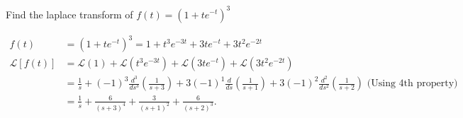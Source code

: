 \begin{exercise}
	Find the laplace transform of $f(t)=\left(1+t e^{-t}\right)^{3}$
\end{exercise}
\begin{answer}
	\begin{align*}
	f(t)&=\left(1+t e^{-t}\right)^{3}=1+t^{3} e^{-3 t}+3 t e^{-t}+3 t^{2} e^{-2 t} \\
	\mathcal{L}[f(t)]&=\mathcal{L}(1)+\mathcal{L}\left(t^{3} e^{-3 t}\right)+\mathcal{L}\left(3 t e^{-t}\right)+\mathcal{L}\left(3 t^{2} e^{-2 t}\right)\\
	&=\frac{1}{s}+(-1)^{3} \frac{d^{3}}{d s^{3}}\left(\frac{1}{s+3}\right)+3(-1)^{1} \frac{d}{d s}\left(\frac{1}{s+1}\right)+3(-1)^{2} \frac{d^{2}}{d s^{2}}\left(\frac{1}{s+2}\right)\text{ (Using 4th property)}\\
	&=\frac{1}{s}+\frac{6}{(s+3)^{4}}+\frac{3}{(s+1)^{2}}+\frac{6}{(s+2)^{3}} \text {. }
	\end{align*}
\end{answer}
